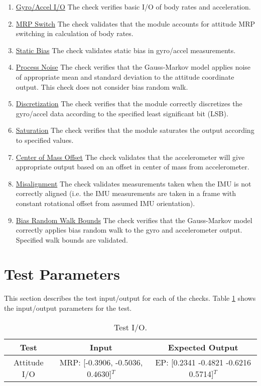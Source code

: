 \documentclass[]{BasiliskReportMemo}
\begin{document}
\begin{enumerate}
	\item \underline{Gyro/Accel I/O} The check verifies basic I/O of body rates and acceleration.
	\item \underline{MRP Switch} The check validates that the module accounts for attitude MRP switching in calculation of body rates.
	\item \underline{Static Bias} The check validates static bias in gyro/accel measurements.
	\item \underline{Process Noise} The check verifies that the Gauss-Markov model applies noise of appropriate mean and standard deviation to the attitude coordinate output. This check does not consider bias random walk.
	\item \underline{Discretization} The check verifies that the module correctly discretizes the gyro/accel data according to the specified least significant bit (LSB).
	\item \underline{Saturation} The check verifies that the module saturates the output according to specified values.
	\item \underline{Center of Mass Offset} The check validates that the accelerometer will give appropriate output based on an offset in center of mass from accelerometer.
	\item \underline{Misalignment} The check validates measurements taken when the IMU is not correctly aligned (i.e. the IMU measurements are taken in a frame with constant rotational offset from assumed IMU orientation).
	\item \underline{Bias Random Walk Bounds} The check verifies that the Gauss-Markov model correctly applies bias random walk to the gyro and accelerometer output. Specified walk bounds are validated.
\end{enumerate} 

\section{Test Parameters}

This section describes the test input/output for each of the checks. Table \ref{tab:parameters} shows the input/output parameters for the test.

\begin{table}[htbp]
	\caption{Test I/O.}
	\label{tab:parameters}
	\centering \fontsize{10}{10}\selectfont
	\begin{tabular}{ c | c | c }
		\hline
		Test   & Input & Expected Output \\ \hline
		Attitude I/O & MRP: [-0.3906, -0.5036, 0.4630]$^T$ & EP: [0.2341   -0.4821   -0.6216    0.5714]$^T$ \\ \hline
	\end{tabular}
\end{table}
\end{document}
